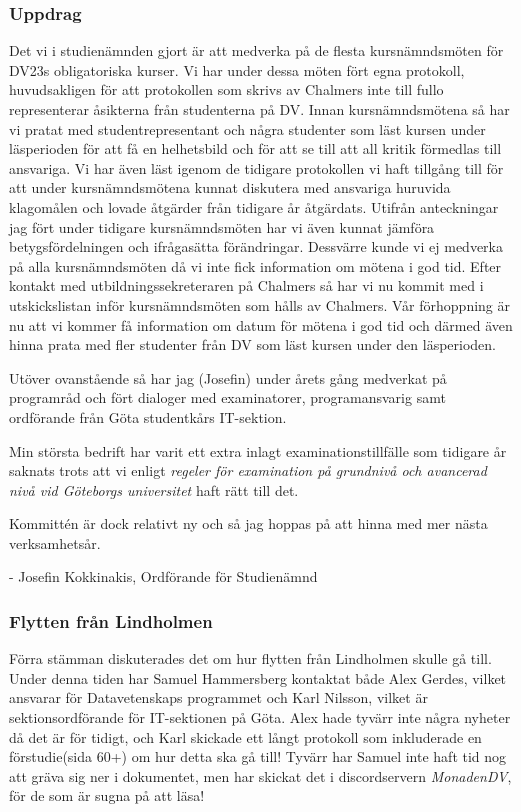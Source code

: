\documentclass[protokoll]{dvd}
\begin{document}
\subsubsection*{Uppdrag}
Det vi i studienämnden gjort är att medverka på de flesta kursnämndsmöten för DV23s obligatoriska kurser. Vi har under dessa möten fört egna protokoll, huvudsakligen för att protokollen som skrivs av Chalmers inte till fullo representerar åsikterna från studenterna på DV. Innan kursnämndsmötena så har vi pratat med studentrepresentant och några studenter som läst kursen under läsperioden för att få en helhetsbild och för att se till att all kritik förmedlas till ansvariga. Vi har även läst igenom de tidigare protokollen vi haft tillgång till för att under kursnämndsmötena kunnat diskutera med ansvariga huruvida klagomålen och lovade åtgärder från tidigare år åtgärdats. Utifrån anteckningar jag fört under tidigare kursnämndsmöten har vi även kunnat jämföra betygsfördelningen och ifrågasätta förändringar. Dessvärre kunde vi ej medverka på alla kursnämndsmöten då vi inte fick information om mötena i god tid. Efter kontakt med utbildningssekreteraren på Chalmers så har vi nu kommit med i utskickslistan inför kursnämndsmöten som hålls av Chalmers. Vår förhoppning är nu att vi kommer få information om datum för mötena i god tid och därmed även hinna prata med fler studenter från DV som läst kursen under den läsperioden.

Utöver ovanstående så har jag (Josefin) under årets gång medverkat på programråd och fört dialoger med examinatorer, programansvarig samt ordförande från Göta studentkårs IT-sektion.

Min största bedrift har varit ett extra inlagt examinationstillfälle som tidigare år saknats trots att vi enligt \textit{regeler för examination på grundnivå och avancerad nivå vid Göteborgs universitet} haft rätt till det.

Kommittén är dock relativt ny och så jag hoppas på att hinna med mer nästa verksamhetsår.

- Josefin Kokkinakis, Ordförande för Studienämnd

\subsubsection*{Flytten från Lindholmen}
Förra stämman diskuterades det om hur flytten från Lindholmen skulle gå till.
Under denna tiden har Samuel Hammersberg kontaktat både Alex Gerdes, vilket ansvarar för Datavetenskaps programmet
och Karl Nilsson, vilket är sektionsordförande för IT-sektionen på Göta.
Alex hade tyvärr inte några nyheter då det är för tidigt, och
Karl skickade ett långt protokoll som inkluderade en förstudie(sida 60+) om hur detta ska gå till!
Tyvärr har Samuel inte haft tid nog att gräva sig ner i dokumentet, men har skickat det
i discordservern \emph{MonadenDV}, för de som är sugna på att läsa!
\end{document}
